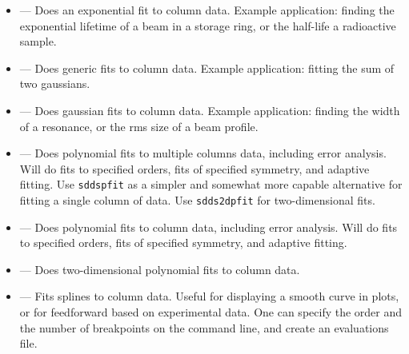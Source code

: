 \documentclass[11pt]{article}
\begin{document}
\begin{itemize}

\item {} --- Does an exponential fit to column data.  Example
application: finding the exponential lifetime of a beam in a storage ring, or the half-life a radioactive
sample.

\item {} --- Does generic fits to column data.  Example application:
fitting the sum of two gaussians.

\item {} --- Does gaussian fits to column data.  Example application:
finding the width of a resonance, or the rms size of a beam profile.


\item {} --- Does polynomial fits to multiple columns
data, including error analysis.  Will do fits to specified orders,
fits of specified symmetry, and adaptive fitting.  Use {\tt sddspfit}
as a simpler and somewhat more capable alternative for fitting a
single column of data. Use {\tt sdds2dpfit} for two-dimensional fits.

\item {} --- Does polynomial fits to column data,
including error analysis.  Will do fits to specified orders, fits of
specified symmetry, and adaptive fitting.

\item {} --- Does two-dimensional polynomial fits to column data.

\item {} --- Fits splines to column data. Useful for displaying a smooth curve in plots, or for feedforward based on experimental data. One can specify the order and the number of breakpoints on the command line, and create an evaluations file.

\end{itemize}
\end{document}
